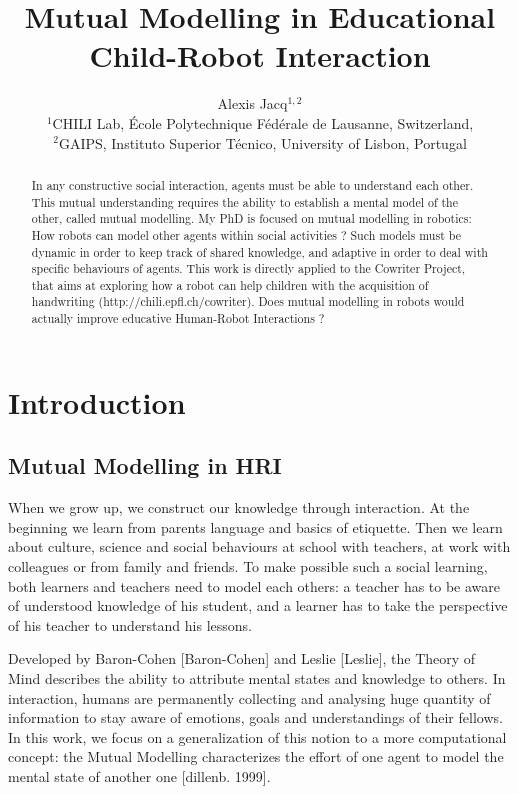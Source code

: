 \documentclass[10pt,a4paper,twocolumn]{article}
\begin{document}
\title{Mutual Modelling in Educational Child-Robot Interaction}


\author{Alexis Jacq$^{1,2}$\\
$^1$CHILI Lab, \'Ecole Polytechnique F\'ed\'erale de Lausanne, Switzerland,\\
$^2$GAIPS, Instituto Superior T\'{e}cnico, University of Lisbon, Portugal}




\maketitle
\begin{abstract}
In any constructive social interaction, agents must be able to understand each other. This mutual understanding requires the ability to establish a mental model of the other, called mutual modelling. My PhD is focused on mutual modelling in robotics: How robots can model other agents within social activities ? Such models must be dynamic in order to keep track of shared knowledge, and adaptive in order to deal with specific behaviours of agents. 
This work is directly applied to the Cowriter Project, that aims at exploring how a robot can help children with the acquisition of handwriting (http://chili.epfl.ch/cowriter). Does mutual modelling in robots would actually improve educative Human-Robot Interactions ?
\end{abstract}

\section{Introduction}
\subsection{Mutual Modelling in HRI}

When we grow up, we construct our knowledge through interaction. At the beginning we learn from parents language and basics of etiquette. Then we learn about culture, science and social behaviours at school with teachers, at work with colleagues or from family and friends. To make possible such a social learning, both learners and teachers need to model each others: a teacher has to be aware of understood knowledge of his student, and a learner has to take the perspective of his teacher to understand his lessons. 

Developed by Baron-Cohen [Baron-Cohen] and Leslie [Leslie], the Theory of Mind describes the ability to attribute mental states and knowledge to others. In interaction, humans are permanently collecting and analysing huge quantity of information to stay aware of emotions, goals and understandings of their fellows. In this work, we focus on a generalization of this notion to a more computational concept: the Mutual Modelling characterizes the effort of one agent to model the mental state of another one [dillenb. 1999]. 
\end{document}
